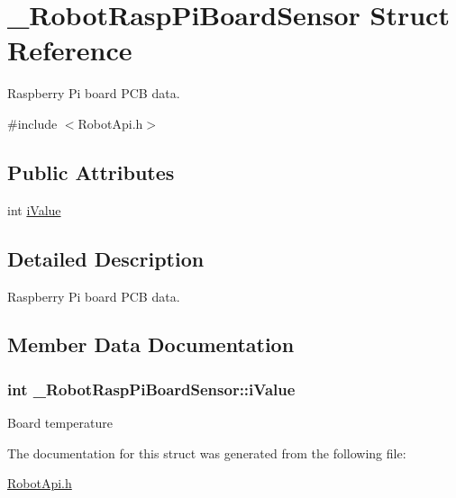 \hypertarget{struct__RobotRaspPiBoardSensor}{\section{\+\_\+\+Robot\+Rasp\+Pi\+Board\+Sensor Struct Reference}
\label{struct__RobotRaspPiBoardSensor}
}


Raspberry Pi board P\+C\+B data.  




{\ttfamily \#include $<$Robot\+Api.\+h$>$}

\subsection*{Public Attributes}
\begin{DoxyCompactItemize}
\item 
int \hyperlink{struct__RobotRaspPiBoardSensor_a6121402932f93d71f7b1140d087079cf}{i\+Value}
\end{DoxyCompactItemize}


\subsection{Detailed Description}
Raspberry Pi board P\+C\+B data. 

\subsection{Member Data Documentation}
\hypertarget{struct__RobotRaspPiBoardSensor_a6121402932f93d71f7b1140d087079cf}{
\subsubsection[{i\+Value}]{\setlength{\rightskip}{0pt plus 5cm}int \+\_\+\+Robot\+Rasp\+Pi\+Board\+Sensor\+::i\+Value}}\label{struct__RobotRaspPiBoardSensor_a6121402932f93d71f7b1140d087079cf}
Board temperature 

The documentation for this struct was generated from the following file\+:\begin{DoxyCompactItemize}
\item 
\hyperlink{RobotApi_8h}{Robot\+Api.\+h}\end{DoxyCompactItemize}
